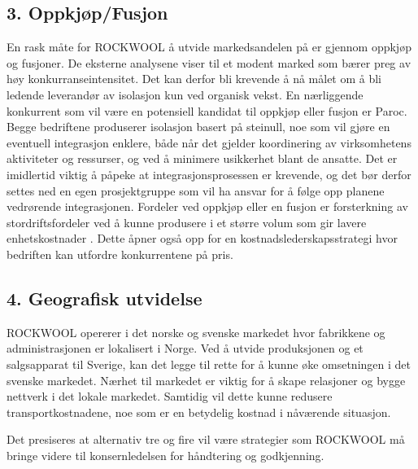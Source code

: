\subsection*{3. Oppkjøp/Fusjon}
En rask måte for ROCKWOOL å utvide markedsandelen på er gjennom oppkjøp og fusjoner. De eksterne analysene viser til et modent marked som bærer preg av høy konkurranseintensitet. Det kan derfor bli krevende å nå målet om å bli ledende leverandør av isolasjon kun ved organisk vekst. En nærliggende konkurrent som vil være en potensiell kandidat til oppkjøp eller fusjon er Paroc. Begge bedriftene produserer isolasjon basert på steinull, noe som vil gjøre en eventuell integrasjon enklere, både når det gjelder koordinering av virksomhetens aktiviteter og ressurser, og ved å minimere usikkerhet blant de ansatte. Det er imidlertid viktig å påpeke at integrasjonsprosessen er krevende, og det bør derfor settes ned en egen prosjektgruppe som vil ha ansvar for å følge opp planene vedrørende integrasjonen. Fordeler ved oppkjøp eller en fusjon er forsterkning av stordriftsfordeler ved å kunne produsere i et større volum som gir lavere enhetskostnader \cite[s.~240-242]{FjeldstadogLunnan2018}. Dette åpner også opp for en kostnadslederskapsstrategi hvor bedriften kan utfordre konkurrentene på pris.

\subsection*{4. Geografisk utvidelse}
ROCKWOOL opererer i det norske og svenske markedet hvor fabrikkene og administrasjonen er lokalisert i Norge. Ved å utvide produksjonen og et salgsapparat til Sverige, kan det legge til rette for å kunne øke omsetningen i det svenske markedet. Nærhet til markedet er viktig for å skape relasjoner og bygge nettverk i det lokale markedet. Samtidig vil dette kunne redusere transportkostnadene, noe som er en betydelig kostnad i nåværende situasjon.

\indent \newline
Det presiseres at alternativ tre og fire vil være strategier som ROCKWOOL må bringe videre til konsernledelsen for håndtering og godkjenning.